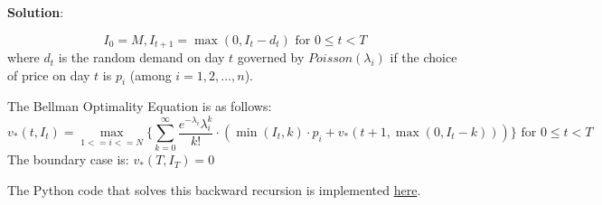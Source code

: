 \documentclass[12pt]{exam}
\begin{document}
\begin{questions}
{\bf Solution}:
 
 $$I_0 = M, I_{t+1} = \max(0, I_t - d_t) \mbox{ for } 0 \leq t < T$$
 where $d_t$ is the random demand on day $t$ governed by $Poisson(\lambda_i)$ if the choice of price on day $t$ is $p_i$ (among $i = 1, 2, \ldots, n$).
 
 The Bellman Optimality Equation is as follows:
 $$v_*(t, I_t) = \max_{1 <= i <= N} \{ \sum_{k=0}^{\infty} \frac {e^{-\lambda_i} \lambda_i^k} {k!} \cdot (\min(I_t, k) \cdot p_i + v_*(t+1, \max(0, I_t - k))) \}\mbox{ for } 0 \leq t < T$$
 The boundary case is: $v_*(T, I_T) = 0$
 
The Python code that solves this backward recursion is implemented \href{https://github.com/coverdrive/MDP-DP-RL/blob/master/src/examples/price_control.py}{here}.

\end{questions}
\end{document}
